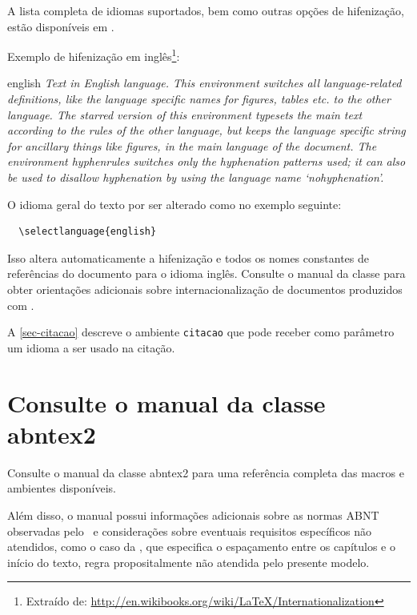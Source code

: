 A lista completa de idiomas suportados, bem como outras opções de hifenização, estão disponíveis em \textcite[5-6]{babel}.

Exemplo de hifenização em inglês\footnote{Extraído de: \url{http://en.wikibooks.org/wiki/LaTeX/Internationalization}}:

\begin{otherlanguage*}{english}
\textit{Text in English language. This environment switches all language-related definitions, like the language specific names for figures, tables etc. to the other language. The starred version of this environment typesets the main text according to the rules of the other language, but keeps the language specific string for ancillary things like figures, in the main language of the document. The environment hyphenrules switches only the hyphenation patterns used; it can also be used to disallow hyphenation by using the language name `nohyphenation'.}
\end{otherlanguage*}

O idioma geral do texto por ser alterado como no exemplo seguinte:

\begin{verbatim}
  \selectlanguage{english}
\end{verbatim}

Isso altera automaticamente a hifenização e todos os nomes constantes de referências do documento para o idioma inglês. Consulte o manual da classe \cite{abntex2classe} para obter orientações adicionais sobre internacionalização de documentos produzidos com \abnTeX.

A \autoref{sec-citacao} descreve o ambiente \texttt{citacao} que pode receber como parâmetro um idioma a ser usado na citação.

\section{Consulte o manual da classe \textsf{abntex2}}

Consulte o manual da classe \textsf{abntex2} \cite{abntex2classe} para uma referência completa das macros e ambientes disponíveis. 

Além disso, o manual possui informações adicionais sobre as normas ABNT observadas pelo \abnTeX\ e considerações sobre eventuais requisitos específicos não atendidos, como o caso da \textcite[seção 5.2.2]{NBR14724:2011}, que especifica o espaçamento entre os capítulos e o início do texto, regra propositalmente não atendida pelo presente modelo.

